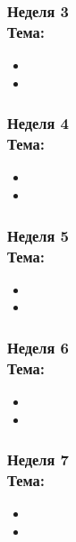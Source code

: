 \documentclass[a4paper,11pt]{article}
\begin{document}
\subsubsection{Неделя 3\\ Тема: }

\begin{itemize}
    \item 
    \item 
\end{itemize}

\subsubsection{Неделя 4\\ Тема: }

\begin{itemize}
    \item 
    \item 
\end{itemize}

\subsubsection{Неделя 5\\ Тема: }

\begin{itemize}
    \item 
    \item 
\end{itemize}

\subsubsection{Неделя 6\\ Тема: }

\begin{itemize}
    \item 
    \item 
\end{itemize}

\subsubsection{Неделя 7\\ Тема: }

\begin{itemize}
    \item 
    \item 
\end{itemize}
\end{document}
